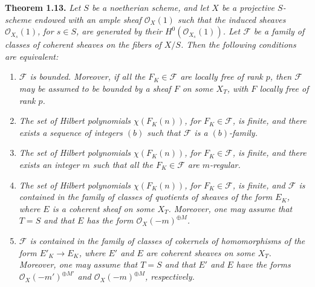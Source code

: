 
\textbf{Theorem 1.13.} \emph{Let \(S\) be a noetherian scheme, and let
\(X\) be a projective \(S\)-scheme endowed with an ample sheaf
\(\mathcal O_X(1)\) such that the induced sheaves \(\mathcal O_{X_s}(1)\),
for \(s\in S\), are generated by their \(H^0(\mathcal O_{X_s}(1))\). Let
\(\mathcal F\) be a family of classes of coherent sheaves on the fibers of
\(X/S\). Then the following conditions are equivalent:}
\begin{enumerate}[label=(\roman*)]
\item \emph{\(\mathcal F\) is bounded. Moreover, if all the
\(F_K\in\mathcal F\) are locally free of rank \(p\), then \(\mathcal F\)
may be assumed to be bounded by a sheaf \(F\) on some \(X_T\), with \(F\)
locally free of rank \(p\).}
\item \emph{The set of Hilbert polynomials \(\chi(F_K(n))\), for
\(F_K\in\mathcal F\), is finite, and there exists a sequence of integers
\((b)\) such that \(\mathcal F\) is a \((b)\)-family.}
\item \emph{The set of Hilbert polynomials \(\chi(F_K(n))\), for
\(F_K\in\mathcal F\), is finite, and there exists an integer \(m\) such
that all the \(F_K\in\mathcal F\) are \(m\)-regular.}
\item \emph{The set of Hilbert polynomials \(\chi(F_K(n))\), for
\(F_K\in\mathcal F\), is finite, and \(\mathcal F\) is contained in the
family of classes of quotients of sheaves of the form \(E_K\), where \(E\)
is a coherent sheaf on some \(X_T\). Moreover, one may assume that \(T=S\)
and that \(E\) has the form \(\mathcal O_X(-m)^{\oplus M}\).}
\item \emph{\(\mathcal F\) is contained in the family of classes of
cokernels of homomorphisms of the form \(E'_K\to E_K\), where \(E'\) and
\(E\) are coherent sheaves on some \(X_T\). Moreover, one may assume that
\(T=S\) and that \(E'\) and \(E\) have the forms
\(\mathcal O_X(-m')^{\oplus M'}\) and \(\mathcal O_X(-m)^{\oplus M}\),
respectively.}
\end{enumerate}

